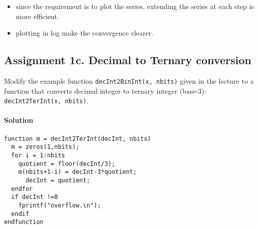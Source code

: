 \documentclass[12pt,a4paper,hidelinks,fleqn]{article}            %
\begin{document}
\begin{itemize}
\item since the requirement is to plot the series, extending the series at each step is more efficient.
\item plotting in log make the convergence clearer.
\end{itemize}

\subsection*{Assignment 1c. Decimal to Ternary conversion}
Modify the example function \verb=decInt2BinInt(x, nbits)= given in the lecture to  
a function that converts decimal integer to ternary integer (base-3): \verb=decInt2TerInt(x, nbits)=.

\paragraph{Solution}
\begin{verbatim}
function m = decInt2TerInt(decInt, nbits)
  m = zeros(1,nbits);
  for i = 1:nbits
    quotient = floor(decInt/3);
    m(nbits+1-i) = decInt-3*quotient;
	  decInt = quotient;
  endfor
  if decInt !=0
    fprintf("overflow.\n");
  endif
endfunction
\end{verbatim}
\end{document}
